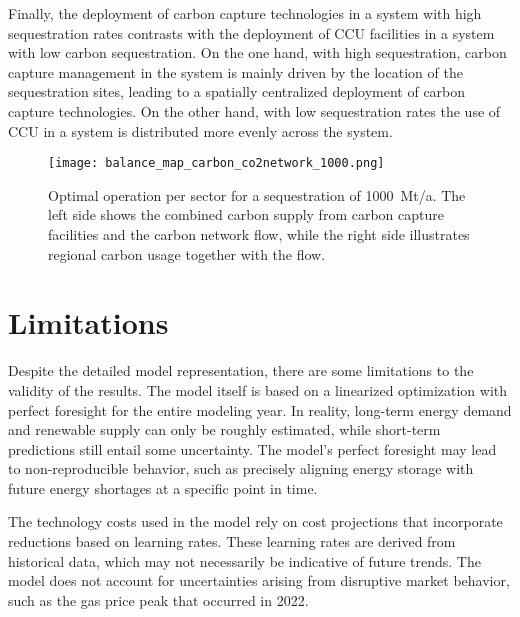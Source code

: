\documentclass[conference]{IEEEtran}
\begin{document}
Finally, the deployment of carbon capture technologies in a system with high sequestration rates contrasts with the deployment of CCU facilities in a system with low carbon sequestration. On the one hand, with high sequestration, carbon capture management in the system is mainly driven by the location of the sequestration sites, leading to a spatially centralized deployment of carbon capture technologies. On the other hand, with low sequestration rates the use of CCU in a system is distributed more evenly across the system.


\begin{figure*}[ht!]
    \centering
    \texttt{[image: balance\_map\_carbon\_co2network\_1000.png]}
    \caption{Optimal operation per sector for a sequestration of 1000~Mt/a. The left side shows the combined carbon supply from carbon capture facilities and the carbon network flow, while the right side illustrates regional carbon usage together with the flow.}
    \label{fig:balance_map_noco2network_1000}
\end{figure*}


\section{Limitations}
\label{sec:limitations}

Despite the detailed model representation, there are some limitations to the validity of the results. The model itself is based on a linearized optimization with perfect foresight for the entire modeling year. In reality, long-term energy demand and renewable supply can only be roughly estimated, while short-term predictions still entail some uncertainty. The model's perfect foresight may lead to non-reproducible behavior, such as precisely aligning energy storage with future energy shortages at a specific point in time.

The technology costs used in the model rely on cost projections that incorporate reductions based on learning rates. These learning rates are derived from historical data, which may not necessarily be indicative of future trends. The model does not account for uncertainties arising from disruptive market behavior, such as the gas price peak that occurred in 2022.

\end{document}
